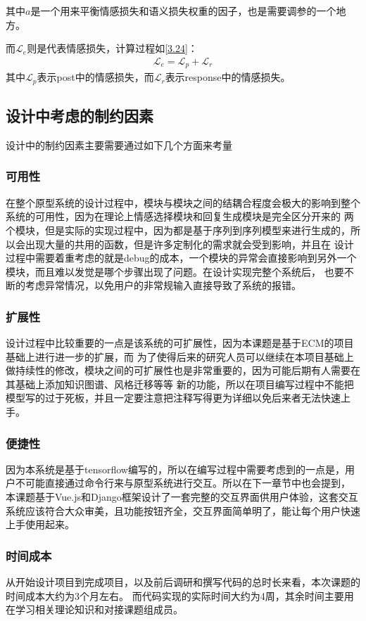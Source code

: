 \documentclass[supercite]{HustGraduPaper}
\theoremstyle{definition}
\begin{document}
其中$a$是一个用来平衡情感损失和语义损失权重的因子，也是需要调参的一个地方。

而$\mathcal{L}_e$则是代表情感损失，计算过程如\ref{3.24}：
\begin{align}
  \mathcal{L}_e = \mathcal{L}_p + \mathcal{L}_r \label{3.24}
\end{align}
其中$\mathcal{L}_p$表示post中的情感损失，而$\mathcal{L}_r$表示response中的情感损失。

\subsection{设计中考虑的制约因素}
设计中的制约因素主要需要通过如下几个方面来考量
\subsubsection{可用性}
在整个原型系统的设计过程中，模块与模块之间的结耦合程度会极大的影响到整个系统的可用性，因为在理论上情感选择模块和回复生成模块是完全区分开来的
两个模块，但是实际的实现过程中，因为都是基于序列到序列模型来进行生成的，所以会出现大量的共用的函数，但是许多定制化的需求就会受到影响，并且在
设计过程中需要着重考虑的就是debug的成本，一个模块的异常会直接影响到另外一个模块，而且难以发觉是哪个步骤出现了问题。在设计实现完整个系统后，
也要不断的考虑异常情况，以免用户的非常规输入直接导致了系统的报错。

\subsubsection{扩展性}
设计过程中比较重要的一点是该系统的可扩展性，因为本课题是基于ECM\cite{DBLP:journals/corr/ZhouHZZL17}的项目基础上进行进一步的扩展，而
为了使得后来的研究人员可以继续在本项目基础上做持续性的修改，模块之间的可扩展性也是非常重要的，因为可能后期有人需要在其基础上添加知识图谱、风格迁移等等
新的功能，所以在项目编写过程中不能把模型写的过于死板，并且一定要注意把注释写得更为详细以免后来者无法快速上手。

\subsubsection{便捷性}
因为本系统是基于tensorflow编写的，所以在编写过程中需要考虑到的一点是，用户不可能直接通过命令行来与原型系统进行交互。所以在下一章节中也会提到，
本课题基于Vue.js和Django框架设计了一套完整的交互界面供用户体验，这套交互系统应该符合大众审美，且功能按钮齐全，交互界面简单明了，能让每个用户快速
上手使用起来。

\subsubsection{时间成本}
从开始设计项目到完成项目，以及前后调研和撰写代码的总时长来看，本次课题的时间成本大约为3个月左右。
而代码实现的实际时间大约为4周，其余时间主要用在学习相关理论知识和对接课题组成员。
\end{document}
